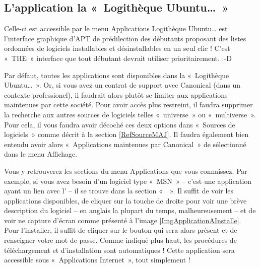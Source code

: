 {\subsection{L'application la «~Logithèque Ubuntu\dots{}~»}
Celle-ci est accessible par le menu Applications \FlecheDroite Logithèque Ubuntu\dots{} est l'interface graphique d'APT de prédilection des débutants proposant des listes ordonnées de logiciels installables et désinstallables en un seul clic ! C'est «~THE~» interface que tout débutant devrait utiliser prioritairement. :-D
\begin{nota}
Par défaut, toutes les applications sont disponibles dans la «~Logithèque Ubuntu\dots{}~». Or, si vous avez un contrat de support avec Canonical (dans un contexte professionel), il faudrait alors plutôt se limiter aux applications maintenues par cette société. Pour avoir accès plus restreint, il faudra supprimer la recherche aux autres sources de logiciels telles «~universe~» ou «~multiverse~». Pour cela, il vous faudra avoir décoché ces deux options dans «~Sources de logiciels~» comme décrit à la section \ref{RefSourceMAJ}. Il faudra également bien entendu avoir alors «~Applications maintenues par Canonical~» de sélectionné dans le menu Affichage.
\end{nota}
Vous y retrouverez les sections du menu Applications que vous connaissez. Par exemple, si vous avez besoin d'un logiciel type «~MSN~» -- c'est une application ayant un lien avec l' -- il se trouve dans la section «~~». Il suffit de voir les applications disponibles, de cliquer sur la touche de droite pour voir une brève description du logiciel -- en anglais la plupart du temps, malheureusement -- et de voir ne capture d'écran comme présenté à l'image \ref{ImgApplicationAInstalle}. Pour l'installer, il suffit de cliquer sur le bouton qui sera alors présent et de renseigner votre mot de passe. Comme indiqué plus haut, les procédures de téléchargement et d'installation sont automatiques ! Cette application sera accessible sous «~Applications \FlecheDroite Internet~», tout simplement !\\
}
